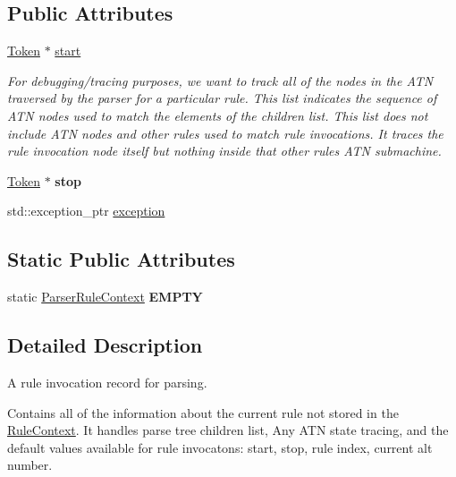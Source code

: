 \subsection*{Public Attributes}
\begin{DoxyCompactItemize}
\item 
\hyperlink{classantlr4_1_1Token}{Token} $\ast$ \hyperlink{classantlr4_1_1ParserRuleContext_a2e3580cf80f49dc92cec0ad4c8ea9ba0}{start}
\begin{DoxyCompactList}\small\item\em For debugging/tracing purposes, we want to track all of the nodes in the A\+TN traversed by the parser for a particular rule. This list indicates the sequence of A\+TN nodes used to match the elements of the children list. This list does not include A\+TN nodes and other rules used to match rule invocations. It traces the rule invocation node itself but nothing inside that other rule\textquotesingle{}s A\+TN submachine. \end{DoxyCompactList}\item 
\mbox{\label{classantlr4_1_1ParserRuleContext_ab5a3e2dbb7315e1245be9b90f93a53b5}} 
\hyperlink{classantlr4_1_1Token}{Token} $\ast$ {\bfseries stop}
\item 
std\+::exception\+\_\+ptr \hyperlink{classantlr4_1_1ParserRuleContext_ac427da1597154161775151dfee4069fa}{exception}
\end{DoxyCompactItemize}
\subsection*{Static Public Attributes}
\begin{DoxyCompactItemize}
\item 
\mbox{\label{classantlr4_1_1ParserRuleContext_a41d719f482d60677ec1fbf08b7e5e77c}} 
static \hyperlink{classantlr4_1_1ParserRuleContext}{Parser\+Rule\+Context} {\bfseries E\+M\+P\+TY}
\end{DoxyCompactItemize}


\subsection{Detailed Description}
A rule invocation record for parsing. 

Contains all of the information about the current rule not stored in the \hyperlink{classantlr4_1_1RuleContext}{Rule\+Context}. It handles parse tree children list, Any A\+TN state tracing, and the default values available for rule invocatons\+: start, stop, rule index, current alt number.

